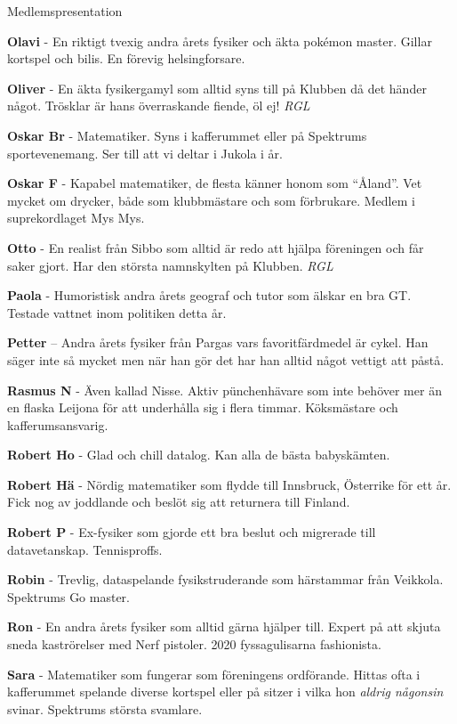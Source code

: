 \documentclass{spektraklet}
\begin{document}
\begin{artikel}{Medlemspresentation}{}
\begin{twocolumns}
\textbf{Olavi} - En riktigt tvexig andra årets fysiker och äkta pokémon master. Gillar kortspel och bilis. En förevig helsingforsare.

\textbf{Oliver} - En äkta fysikergamyl som alltid syns till på Klubben då det händer något. Trösklar är hans överraskande fiende, öl ej! \emph{RGL}

\textbf{Oskar Br} - Matematiker. Syns i kafferummet eller på Spektrums sportevenemang. Ser till att vi deltar i Jukola i år.

\textbf{Oskar F} -  Kapabel matematiker, de flesta känner honom som ``Åland''. Vet mycket om drycker, både som klubbmästare och som förbrukare. Medlem i suprekordlaget Mys Mys.

\textbf{Otto} - En realist från Sibbo som alltid är redo att hjälpa föreningen och får saker gjort. Har den största namnskylten på Klubben. \emph{RGL} %

\textbf{Paola} - Humoristisk andra årets geograf och tutor som älskar en bra GT. Testade vattnet inom politiken detta år.

\textbf{Petter} – Andra årets fysiker från Pargas vars favoritfärdmedel är cykel. Han säger inte så mycket men när han gör det har han alltid något vettigt att påstå.

\textbf{Rasmus N} - Även kallad Nisse. Aktiv pünchenhävare som inte behöver mer än en flaska Leijona för att underhålla sig i flera timmar. Köksmästare och kafferumsansvarig.

\textbf{Robert Ho} - Glad och chill datalog. Kan alla de bästa babyskämten. %

\textbf{Robert Hä} - Nördig matematiker som flydde till Innsbruck, Österrike för ett år. Fick nog av joddlande och beslöt sig att returnera till Finland. %

\textbf{Robert P} - Ex-fysiker som gjorde ett bra beslut och migrerade till datavetanskap. Tennisproffs.

\textbf{Robin} - Trevlig, dataspelande fysikstruderande som härstammar från Veikkola. Spektrums Go master. %

\textbf{Ron} - En andra årets fysiker som alltid gärna hjälper till. Expert på att skjuta sneda kaströrelser med Nerf pistoler. 2020 fyssagulisarna fashionista.

\textbf{Sara} - Matematiker som fungerar som föreningens ordförande. Hittas ofta i kafferummet spelande diverse kortspel eller på sitzer i vilka hon \emph{aldrig någonsin} svinar. Spektrums största svamlare.


\end{twocolumns}
\end{artikel}
\end{document}
